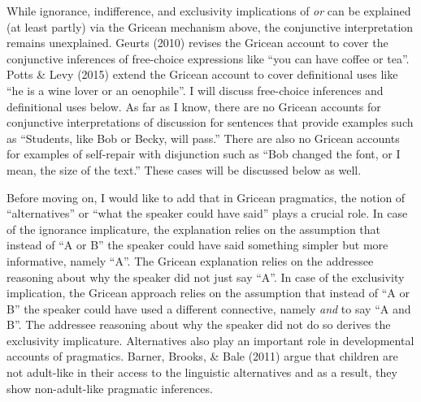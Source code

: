 \documentclass[oneside]{report}
\theoremstyle{definition}
\theoremstyle{definition}
\theoremstyle{definition}
\theoremstyle{remark}
\begin{document}
While ignorance, indifference, and exclusivity implications of \emph{or}
can be explained (at least partly) via the Gricean mechanism above, the
conjunctive interpretation remains unexplained. Geurts (2010) revises
the Gricean account to cover the conjunctive inferences of free-choice
expressions like ``you can have coffee or tea''. Potts \& Levy (2015)
extend the Gricean account to cover definitional uses like ``he is a
wine lover or an oenophile''. I will discuss free-choice inferences and
definitional uses below. As far as I know, there are no Gricean accounts
for conjunctive interpretations of discussion for sentences that provide
examples such as ``Students, like Bob or Becky, will pass.'' There are
also no Gricean accounts for examples of self-repair with disjunction
such as ``Bob changed the font, or I mean, the size of the text.'' These
cases will be discussed below as well.

Before moving on, I would like to add that in Gricean pragmatics, the
notion of ``alternatives'' or ``what the speaker could have said'' plays
a crucial role. In case of the ignorance implicature, the explanation
relies on the assumption that instead of ``A or B'' the speaker could
have said something simpler but more informative, namely ``A''. The
Gricean explanation relies on the addressee reasoning about why the
speaker did not just say ``A''. In case of the exclusivity implication,
the Gricean approach relies on the assumption that instead of ``A or B''
the speaker could have used a different connective, namely \emph{and} to
say ``A and B''. The addressee reasoning about why the speaker did not
do so derives the exclusivity implicature. Alternatives also play an
important role in developmental accounts of pragmatics. Barner, Brooks,
\& Bale (2011) argue that children are not adult-like in their access to
the linguistic alternatives and as a result, they show non-adult-like
pragmatic inferences.
\end{document}
